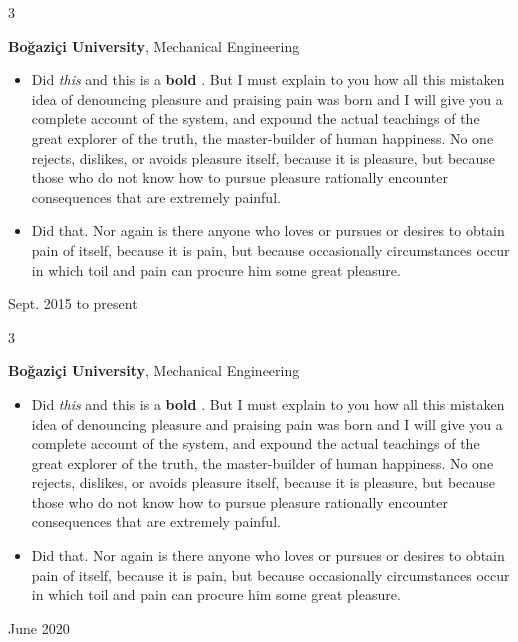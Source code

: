 \documentclass[10pt, letterpaper]{article}
\newenvironment{highlights}{
    \begin{itemize}[
        topsep=0.10 cm,
        parsep=0.10 cm,
        partopsep=0pt,
        itemsep=0pt,
        leftmargin=0.4 cm + 10pt
    ]
}{
    \end{itemize}
} %
\newenvironment{threecolentry}[3][]{
    \onecolentry
    \def\thirdColumn{#3}
    \setcolumnwidth{1 cm, \fill, 4.5 cm}
    \begin{paracol}{3}
    {\raggedright #2} \switchcolumn
}{
    \switchcolumn \raggedleft \thirdColumn
    \end{paracol}
    \endonecolentry
} %
\let\hrefWithoutArrow\href
\renewcommand{\href}[2]{\hrefWithoutArrow{#1}{\mbox{\ifthenelse{\equal{#2}{}}{ }{#2 }\raisebox{.15ex}{\footnotesize \faExternalLink*}}}}
\begin{document}
        \vspace{0.2 cm}

        \begin{threecolentry}{\textbf{}}{
            Sept. 2015 to present
        }
            \textbf{Boğaziçi University}, Mechanical Engineering
            \begin{highlights}
                \item Did \textit{this} and this is a \textbf{bold} \href{https://example.com}{link}. But I must explain to you how all this mistaken idea of denouncing pleasure and praising pain was born and I will give you a complete account of the system, and expound the actual teachings of the great explorer of the truth, the master-builder of human happiness. No one rejects, dislikes, or avoids pleasure itself, because it is pleasure, but because those who do not know how to pursue pleasure rationally encounter consequences that are extremely painful.
                \item Did that. Nor again is there anyone who loves or pursues or desires to obtain pain of itself, because it is pain, but because occasionally circumstances occur in which toil and pain can procure him some great pleasure.
            \end{highlights}
        \end{threecolentry}

        \vspace{0.2 cm}

        \begin{threecolentry}{\textbf{}}{
            June 2020
        }
            \textbf{Boğaziçi University}, Mechanical Engineering
            \begin{highlights}
                \item Did \textit{this} and this is a \textbf{bold} \href{https://example.com}{link}. But I must explain to you how all this mistaken idea of denouncing pleasure and praising pain was born and I will give you a complete account of the system, and expound the actual teachings of the great explorer of the truth, the master-builder of human happiness. No one rejects, dislikes, or avoids pleasure itself, because it is pleasure, but because those who do not know how to pursue pleasure rationally encounter consequences that are extremely painful.
                \item Did that. Nor again is there anyone who loves or pursues or desires to obtain pain of itself, because it is pain, but because occasionally circumstances occur in which toil and pain can procure him some great pleasure.
            \end{highlights}
        \end{threecolentry}
\end{document}
